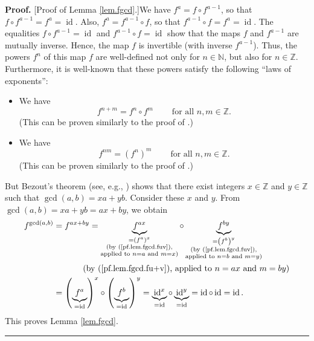 \documentclass[numbers=enddot,12pt,final,onecolumn,notitlepage]{scrartcl}%
\theoremstyle{definition}
\newenvironment{proof}[1][Proof]{\noindent\textbf{#1.} }{\ \rule{0.5em}{0.5em}}
\begin{document}
\begin{proof}
[Proof of Lemma \ref{lem.fgcd}.]We have $f^{a}=f\circ f^{a-1}$, so that
$f\circ f^{a-1}=f^{a}=\operatorname*{id}$. Also, $f^{a}=f^{a-1}\circ f$, so
that $f^{a-1}\circ f=f^{a}=\operatorname*{id}$. The equalities $f\circ
f^{a-1}=\operatorname*{id}$ and $f^{a-1}\circ f=\operatorname*{id}$ show that
the maps $f$ and $f^{a-1}$ are mutually inverse. Hence, the map $f$ is
invertible (with inverse $f^{a-1}$). Thus, the powers $f^{n}$ of this map $f$
are well-defined not only for $n\in\mathbb{N}$, but also for $n\in\mathbb{Z}$.
Furthermore, it is well-known that these powers satisfy the following
\textquotedblleft laws of exponents\textquotedblright:

\begin{itemize}
\item We have%
\begin{equation}
f^{n+m}=f^{n}\circ f^{m}\ \ \ \ \ \ \ \ \ \ \text{for all }n,m\in\mathbb{Z}.
\label{pf.lem.fgcd.fu+v}%
\end{equation}
(This can be proven similarly to the proof of \cite[Proposition 4.1.20
\textbf{(h)}]{19s}.)

\item We have%
\begin{equation}
f^{nm}=\left(  f^{n}\right)  ^{m}\ \ \ \ \ \ \ \ \ \ \text{for all }%
n,m\in\mathbb{Z}. \label{pf.lem.fgcd.fuv}%
\end{equation}
(This can be proven similarly to the proof of \cite[Proposition 4.1.20
\textbf{(l)}]{19s}.)
\end{itemize}

But Bezout's theorem (see, e.g., \cite[Theorem 2.9.12]{19s}) shows that there
exist integers $x\in\mathbb{Z}$ and $y\in\mathbb{Z}$ such that $\gcd\left(
a,b\right)  =xa+yb$. Consider these $x$ and $y$. From $\gcd\left(  a,b\right)
=xa+yb=ax+by$, we obtain%
\begin{align*}
f^{\gcd\left(  a,b\right)  }  &  =f^{ax+by}=\underbrace{f^{ax}}%
_{\substack{=\left(  f^{a}\right)  ^{x}\\\text{(by (\ref{pf.lem.fgcd.fuv}%
),}\\\text{applied to }n=a\text{ and }m=x\text{)}}}\circ\underbrace{f^{by}%
}_{\substack{=\left(  f^{b}\right)  ^{y}\\\text{(by (\ref{pf.lem.fgcd.fuv}%
),}\\\text{applied to }n=b\text{ and }m=y\text{)}}}\\
&  \ \ \ \ \ \ \ \ \ \ \left(  \text{by (\ref{pf.lem.fgcd.fu+v}), applied to
}n=ax\text{ and }m=by\right) \\
&  =\left(  \underbrace{f^{a}}_{=\operatorname*{id}}\right)  ^{x}\circ\left(
\underbrace{f^{b}}_{=\operatorname*{id}}\right)  ^{y}%
=\underbrace{\operatorname*{id}\nolimits^{x}}_{=\operatorname*{id}}%
\circ\underbrace{\operatorname*{id}\nolimits^{y}}_{=\operatorname*{id}%
}=\operatorname*{id}\circ\operatorname*{id}=\operatorname*{id}.
\end{align*}
This proves Lemma \ref{lem.fgcd}.
\end{proof}
\end{document}
